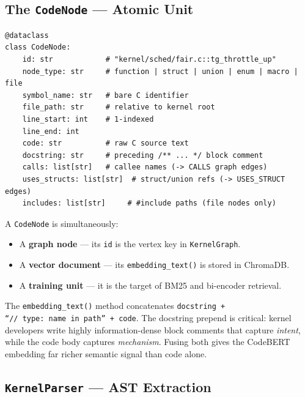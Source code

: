 \documentclass[11pt,a4paper]{article}
\newcommand{\coderef}[1]{\texttt{\small\color{layer2}#1}}
\begin{document}
\subsection{The \texttt{CodeNode} --- Atomic Unit}
\label{sec:codenode}

\begin{tcolorbox}[
  colback=layer1!5, colframe=layer1!50, arc=4pt,
  title={\small\ttfamily core/mirror/parser.py --- CodeNode},
  fonttitle=\bfseries\small\color{layer1!80!black}
]
\begin{lstlisting}
@dataclass
class CodeNode:
    id: str            # "kernel/sched/fair.c::tg_throttle_up"
    node_type: str     # function | struct | union | enum | macro | file
    symbol_name: str   # bare C identifier
    file_path: str     # relative to kernel root
    line_start: int    # 1-indexed
    line_end: int
    code: str          # raw C source text
    docstring: str     # preceding /** ... */ block comment
    calls: list[str]   # callee names (-> CALLS graph edges)
    uses_structs: list[str]  # struct/union refs (-> USES_STRUCT edges)
    includes: list[str]     # #include paths (file nodes only)
\end{lstlisting}
\end{tcolorbox}

A \coderef{CodeNode} is simultaneously:
\begin{itemize}[itemsep=1pt]
  \item A \textbf{graph node} --- its \texttt{id} is the vertex key in \coderef{KernelGraph}.
  \item A \textbf{vector document} --- its \texttt{embedding\_text()} is stored in ChromaDB.
  \item A \textbf{training unit} --- it is the target of BM25 and bi-encoder retrieval.
\end{itemize}

The \coderef{embedding\_text()} method concatenates
\texttt{docstring + ``//~type:~name~in~path'' + code}. The docstring prepend
is critical: kernel developers write highly information-dense block comments
that capture \emph{intent}, while the code body captures \emph{mechanism}.
Fusing both gives the CodeBERT embedding far richer semantic signal than code
alone.

\subsection{\texttt{KernelParser} --- AST Extraction}
\label{sec:parser}
\end{document}

